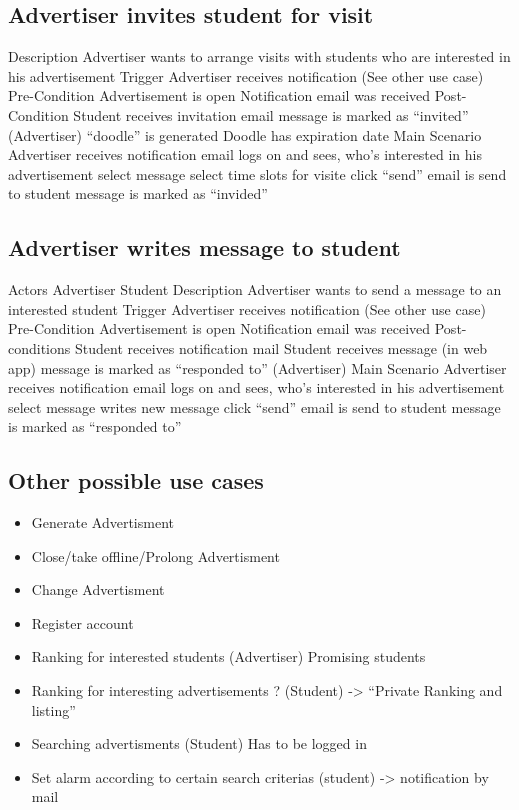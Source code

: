 \documentclass[a4paper,11pt]{article}
\begin{document}
\subsection*{Advertiser invites student for visit}
Description
Advertiser wants to arrange visits with students who are interested in his advertisement
Trigger
Advertiser receives notification (See other use case)
Pre-Condition
Advertisement is open
Notification email was received
Post-Condition
Student receives invitation email
message is marked as “invited” (Advertiser)
“doodle” is generated
Doodle has expiration date
Main Scenario
Advertiser receives notification email
logs on and sees, who's interested in his advertisement
select message
select time slots for visite
click “send”
email is send to student 
message is marked as “invided”

\subsection*{Advertiser writes message to student}
Actors
Advertiser
Student
Description
Advertiser wants to send a message to an interested student
Trigger
Advertiser receives notification (See other use case)
Pre-Condition
Advertisement is open
Notification email was received
Post-conditions
Student receives notification mail
Student receives message (in web app)
message is marked as “responded to” (Advertiser)
Main Scenario
Advertiser receives notification email
logs on and sees, who's interested in his advertisement
select message
writes new message
click “send”
email is send to student 
message is marked as “responded to”

\subsection*{Other possible use cases}
\begin{itemize}
  \item Generate Advertisment
  \item Close/take offline/Prolong Advertisment
  \item Change Advertisment
  \item Register account
  \item Ranking for interested students (Advertiser) Promising students
  \item Ranking for interesting advertisements ? (Student) -> “Private Ranking and listing”
  \item Searching advertisments (Student) Has to be logged in
  \item Set alarm according to certain search criterias (student) -> notification by mail
\end{itemize}
\end{document}
